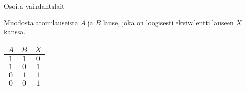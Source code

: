 \begin{tehtavasivu}
\begin{tehtava}
\end{tehtava}

\begin{tehtava}
     Osoita vaihdantalait
    \begin{alakohdat}

    \end{alakohdat}

    \begin{vastaus}
    
        \begin{alakohdat}
        \end{alakohdat}
    \end{vastaus}
    
\end{tehtava}

\begin{tehtava}
     Muodosta atomilauseista $A$ ja $B$ lause, joka on
loogisesti ekvivalentti lauseen $X$ kanssa.

\begin{center}
\begin{tabular}{|c|c|c|}\hline
$A$ & $B$ & $X$\\ \hline
$1$ & $1$ & $0$\\
$1$ & $0$ & $1$\\
$0$ & $1$ & $1$\\
$0$ & $0$ & $1$\\ \hline
\end{tabular}
\end{center}


\end{tehtava}
\end{tehtavasivu}
